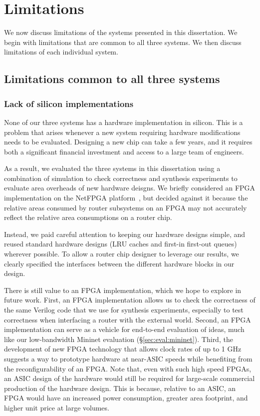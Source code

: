 \chapter{Limitations}
\label{chap:limitations}

We now discuss limitations of the systems presented in this dissertation. We
begin with limitations that are common to all three systems. We then discuss
limitations of each individual system.

\section{Limitations common to all three systems}

\subsection{Lack of silicon implementations} None of our three systems has a
hardware implementation in silicon. This is a problem that arises whenever a
new system requiring hardware modifications needs to be evaluated. Designing a
new chip can take a few years, and it requires both a significant financial
investment and access to a large team of engineers.

 As a result, we evaluated the three systems in this dissertation using a
combination of simulation to check correctness and synthesis experiments to
evaluate area overheads of new hardware deisgns. We briefly considered an FPGA
implementation on the NetFPGA platform~\cite{netfpga}, but decided against it
because the relative areas consumed by router subsystems on an FPGA may not
accurately reflect the relative area consumptions on a router chip.

Instead, we paid careful attention to keeping our hardware designs simple, and
reused standard hardware designs (\eg LRU caches and first-in first-out queues)
wherever possible. To allow a router chip designer to leverage our results, we
clearly specified the interfaces between the different hardware blocks in our
design.

There is still value to an FPGA implementation, which we hope to explore in
future work. First, an FPGA implementation allows us to check the correctness
of the same Verilog code that we use for synthesis experiments, especially to
test correctness when interfacing a router with the external world. Second, an
FPGA implementation can serve as a vehicle for end-to-end evaluation of ideas,
much like our low-bandwidth Mininet evaluation (\S\ref{sec:eval:mininet}).
Third, the development of new FPGA technology that allows clock rates of up to
1 GHz~\cite{hyperflex} suggests a way to prototype hardware at near-ASIC speeds
while benefiting from the reconfigurability of an FPGA. Note that, even with
such high speed FPGAs, an ASIC design of the hardware would still be required
for large-scale commercial production of the hardware design.  This is because,
relative to an ASIC, an FPGA would have an increased power consumption, greater
area footprint, and higher unit price at large volumes.

